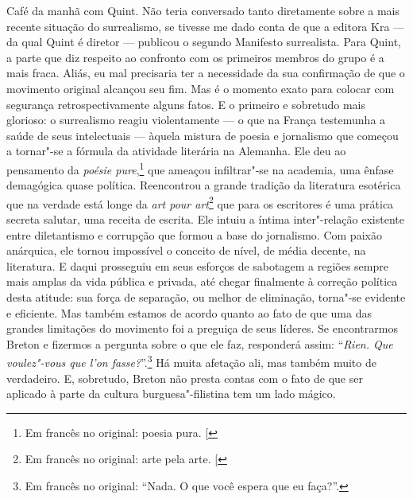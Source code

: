 Café da manhã com Quint. Não teria conversado
tanto diretamente sobre a mais recente situação do surrealismo, se
tivesse me dado conta de que a editora Kra --- da qual Quint é diretor ---
publicou o segundo Manifesto surrealista. Para Quint, a parte que diz
respeito ao confronto com os primeiros membros do grupo é a mais fraca.
Aliás, eu mal precisaria ter a necessidade da sua confirmação de que o
movimento original alcançou seu fim. Mas é o momento exato para colocar
com segurança retrospectivamente alguns fatos. E o primeiro e sobretudo
mais glorioso: o surrealismo reagiu violentamente --- o que na França
testemunha a saúde de seus intelectuais --- àquela mistura de poesia e
jornalismo que começou a tornar"-se a fórmula da atividade literária na
Alemanha. Ele deu ao pensamento da \emph{poésie pure},\footnote{Em francês no original: poesia pura. {[}\versal{N.~T.}{]}} que ameaçou
infiltrar"-se na academia, uma ênfase demagógica quase política.
Reencontrou a grande tradição da literatura esotérica que na verdade
está longe da \emph{art pour art}\footnote{Em francês no original: arte pela arte. {[}\versal{N.~T.}{]}} que para os escritores é uma prática
secreta salutar, uma receita de escrita. Ele intuiu a íntima
inter"-relação existente entre diletantismo e corrupção que formou a base
do jornalismo. Com paixão anárquica, ele tornou impossível o conceito de
nível, de média decente, na literatura. E daqui prosseguiu em seus
esforços de sabotagem a regiões sempre mais amplas da vida pública e
privada, até chegar finalmente à correção política desta atitude: sua força de
separação, ou melhor de eliminação, torna"-se evidente e eficiente. Mas
também estamos de acordo quanto ao fato de que uma das grandes
limitações do movimento foi a preguiça de seus líderes. Se encontrarmos
Breton e fizermos a pergunta sobre o que ele faz, responderá assim: ``\emph{Rien.
Que voulez"-vous que l'on fasse?}''.\footnote{Em francês no original: ``Nada. O que você espera que eu faça?''. \versal{[N.~T.]}} Há muita afetação ali, mas
também muito de verdadeiro. E, sobretudo, Breton não presta contas com o
fato de que ser aplicado à parte da cultura burguesa"-filistina tem um
lado mágico.

